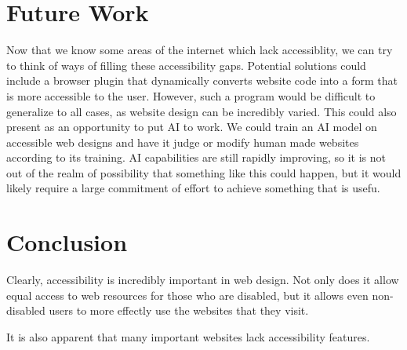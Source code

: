 \documentclass{article}
\begin{document}
\section{Future Work}
Now that we know some areas of the internet which lack accessiblity, we can try to think of ways of filling these accessibility gaps.
Potential solutions could include a browser plugin that dynamically converts website code into a form that is more accessible to the user.
However, such a program would be difficult to generalize to all cases, as website design can be incredibly varied.
This could also present as an opportunity to put AI to work.
We could train an AI model on accessible web designs and have it judge or modify human made websites according to its training.
AI capabilities are still rapidly improving, so it is not out of the realm of possibility that something like this could happen, but it would likely require a large commitment of effort to achieve something that is usefu.


\section{Conclusion}
Clearly, accessibility is incredibly important in web design.
Not only does it allow equal access to web resources for those who are disabled, but it allows even non-disabled users to more effectly use the websites that they visit.

It is also apparent that many important websites lack accessibility features.


\small


\end{document}
